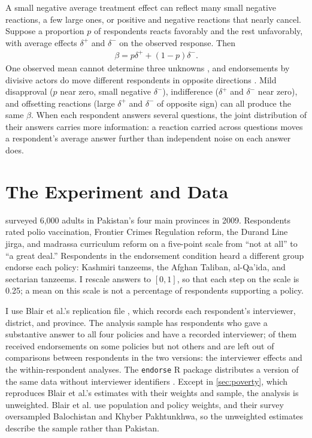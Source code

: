 \documentclass[11pt,letterpaper]{article}
\begin{document}
A small negative average treatment effect can reflect many small negative reactions, a few large ones, or positive and negative reactions that nearly cancel. Suppose a proportion $p$ of respondents reacts favorably and the rest unfavorably, with average effects $\delta^+$ and $\delta^-$ on the observed response. Then
\begin{align}
\beta=p\delta^+ +(1-p)\delta^-.
\label{eq:ate_decomposition}
\end{align}
One observed mean cannot determine three unknowns \citep{manski1990nonparametric, lu2018ordinal}, and endorsements by divisive actors do move different respondents in opposite directions \citep{nicholson2012polarizing}. Mild disapproval ($p$ near zero, small negative $\delta^-$), indifference ($\delta^+$ and $\delta^-$ near zero), and offsetting reactions (large $\delta^+$ and $\delta^-$ of opposite sign) can all produce the same $\beta$. When each respondent answers several questions, the joint distribution of their answers carries more information: a reaction carried across questions moves a respondent's average answer further than independent noise on each answer does.

\section{The Experiment and Data}
\label{sec:data}

\citet{blair2013poverty} surveyed 6,000 adults in Pakistan's four main provinces in 2009. Respondents rated polio vaccination, Frontier Crimes Regulation reform, the Durand Line jirga, and madrassa curriculum reform on a five-point scale from ``not at all'' to ``a great deal.'' Respondents in the endorsement condition heard a different group endorse each policy: Kashmiri tanzeems, the Afghan Taliban, al-Qa'ida, and sectarian tanzeems. I rescale answers to $[0,1]$, so that each step on the scale is 0.25; a mean on this scale is not a percentage of respondents supporting a policy.

I use Blair et al.'s replication file \citep{blair2013replication}, which records each respondent's interviewer, district, and province. The analysis sample has \FullSampleSize{} respondents who gave a substantive answer to all four policies and have a recorded interviewer; \MixedRespondents{} of them received endorsements on some policies but not others and are left out of comparisons between respondents in the two versions: the interviewer effects and the within-respondent analyses. The \texttt{endorse} R package distributes a version of the same data without interviewer identifiers \citep{shiraito2022endorse}. Except in \cref{sec:poverty}, which reproduces Blair et al.'s estimates with their weights and sample, the analysis is unweighted. Blair et al. use population and policy weights, and their survey oversampled Balochistan and Khyber Pakhtunkhwa, so the unweighted estimates describe the sample rather than Pakistan.
\end{document}

